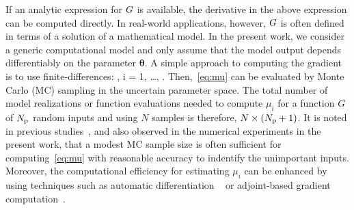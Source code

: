 If an analytic expression for $G$ is available, the derivative in the above
expression can be computed directly. In real-world applications, 
however, $G$ is
often defined in terms of a solution of a mathematical model.  In the
present work, we consider a generic computational model and only assume that
the model output depends differentiably on the parameter $\bm{\theta}$. A
simple approach to computing the gradient is to use finite-differences: 
\be
{} 
\approx
{}, \quad i = 1, \ldots, \Np. 
\label{eq:partial}
\ee
Then,~\eqref{eq:mu} can be evaluated by Monte Carlo (MC) sampling in
the uncertain parameter space. 
The total number of model realizations or function evaluations
needed to
compute $\mu_i$ for a function $G$ of ${N_\text{p}}$ random inputs and using $N$ samples is
therefore, $N\times({N_\text{p}}+1)$. 
It is noted in previous studies~\cite{Kucherenko:2016,Kucherenko:2009},
and also
observed in the numerical experiments in the present work, that a modest MC sample size is often sufficient for computing~\eqref{eq:mu} with
reasonable accuracy to indentify the unimportant inputs. Moreover, the
computational efficiency for estimating $\mu_i$ can be enhanced by using
techniques such as automatic differentiation
~\cite{Kiparissides:2009} or adjoint-based gradient computation~\cite{jameson1988aerodynamic,gunzburger2003perspectives,Borzi2011,AlexanderianPetraStadlerEtAl17}. 

